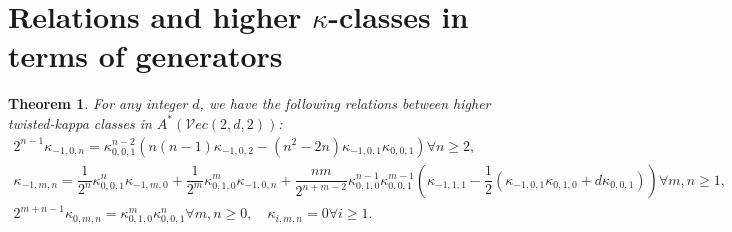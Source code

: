 \documentclass[11pt]{amsart}
\newtheorem{theorem}{Theorem}
\numberwithin{theorem}{section}
\numberwithin{lemma}{section}
\theoremstyle{definition}
\newcommand{\ve}{\mathcal{V}ec}
\newcommand{\ka}{\kappa}
\begin{document}
\section{Relations and higher $\ka$-classes in terms of generators}
\begin{theorem}\label{thm:taut-high}
	For any integer $d$, we have the following relations between higher twisted-kappa classes in $A^*(\ve({2,d,2}))$:
  \begin{gather*}
    2^{n-1}\ka_{-1,0,n} =\ka_{0,0,1}^{n-2}(n(n-1)\ka_{-1,0,2}-(n^2-2n)\ka_{-1,0,1}\ka_{0,0,1}) \forall n\geq 2,\\
    \ka_{-1,m,n} = \dfrac{1}{2^n}\ka_{0,0,1}^n\ka_{-1,m,0}+\dfrac{1}{2^m}\ka_{0,1,0}^m\ka_{-1,0,n}+\dfrac{nm}{2^{n+m-2}}\ka_{0,1,0}^{n-1}\ka_{0,0,1}^{m-1}(\ka_{-1,1,1}-\dfrac{1}{2}(\ka_{-1,0,1}\ka_{0,1,0}+d\ka_{0,0,1}))\forall m,n\geq 1,\\
   2^{m+n-1} \ka_{0,m,n} = \ka_{0,1,0}^m\ka_{0,0,1}^n\forall m,n\geq 0,\quad 
    \ka_{i,m,n} = 0\forall i\geq 1.
  \end{gather*}
\end{theorem}
\end{document}
